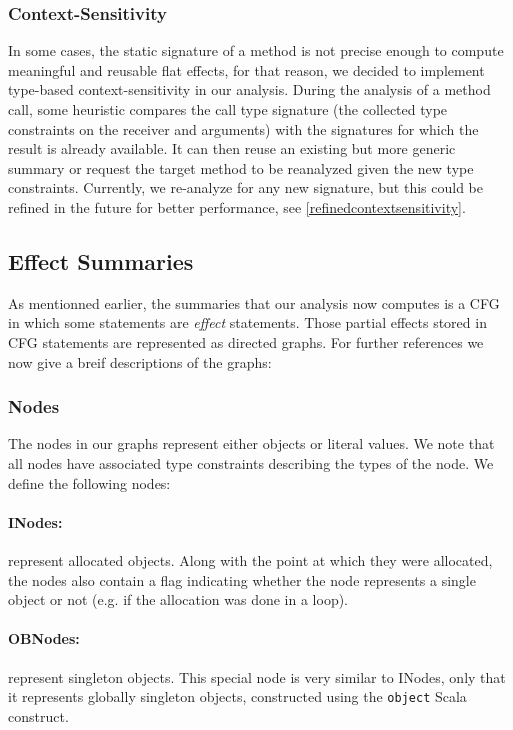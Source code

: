 \documentclass[a4paper]{article}
\begin{document}
\subsubsection{Context-Sensitivity}
In some cases, the static signature of a method is not precise enough to
compute meaningful and reusable flat effects, for that reason, we decided to
implement type-based context-sensitivity in our analysis. During the analysis
of a method call, some heuristic compares the call type signature (the
collected type constraints on the receiver and arguments) with the signatures
for which the result is already available. It can then reuse an existing but
more generic summary or request the target method to be reanalyzed given the new
type constraints. Currently, we re-analyze for any new signature, but this could
be refined in the future for better performance, see
\ref{refinedcontextsensitivity}.

\subsection{Effect Summaries}
As mentionned earlier, the summaries that our analysis now computes is a CFG in
which some statements are \emph{effect} statements. Those partial effects
stored in CFG statements are represented as directed graphs. For further
references we now give a breif descriptions of the graphs:

\subsubsection{Nodes}
The nodes in our graphs represent either objects or literal values. We note
that all nodes have associated type constraints describing the types of the
node. We define the following nodes:

\paragraph{INodes:} represent allocated objects. Along with the point at which
they were allocated, the nodes also contain a flag indicating whether the node
represents a single object or not (e.g. if the allocation was done in a loop).

\paragraph{OBNodes:} represent singleton objects. This special node is very
similar to INodes, only that it represents globally singleton objects,
constructed using the \verb=object= Scala construct.
\end{document}
